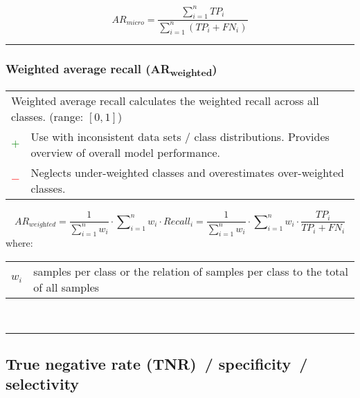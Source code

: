 \documentclass{article}
\makeatletter
\newenvironment{conditions}[1][where:]
	{\hspace{0.02\textwidth} #1 \begin{tabular}[t]{>{$}l<{$} @{${}={}$} l}}
	{\end{tabular}\\[\belowdisplayskip]}
\makeatother
\begin{document}
\begin{equation}
	\textit{AR}_\textit{micro} = \dfrac{\sum\nolimits_{i = 1}^n \textit{TP}_i}{\sum\nolimits_{i = 1}^n (\textit{TP}_i + \textit{FN}_i)}
%
	\label{equation:MIAR}
\end{equation}

\hrule


\subsubsection[Weighted average recall (ARweighted)]{Weighted average recall (AR\textsubscript{weighted}) \cite{gordon1988effect, han2014rule}}

\begin{table}[H]\centering
	\begin{tabular}{m{}m{}}
		\multicolumn{2}{m{0.95\textwidth}}{Weighted average recall calculates the weighted recall across all classes. (range: $[0, 1]$)} \\
		\textcolor{Green}{$+$} & Use with inconsistent data sets / class distributions. Provides overview of overall model performance. \\
		\textcolor{Red}{$-$}   & Neglects under-weighted classes and overestimates over-weighted classes.
	\end{tabular}
\end{table}

\begin{equation}
	\textit{AR}_\textit{weighted} = \dfrac{1}{\sum\nolimits_{i = 1}^n w_i} \cdot \sum\nolimits_{i = 1}^n w_i \cdot \textit{Recall}_i = \dfrac{1}{\sum\nolimits_{i = 1}^n w_i} \cdot \sum\nolimits_{i = 1}^n w_i \cdot \dfrac{\textit{TP}_i}{\textit{TP}_i + \textit{FN}_i}
%
	\label{equation:WAR}
\end{equation}
%
\begin{conditions}
	w_i & samples per class or the relation of samples per class to the total of all samples
\end{conditions}

\hrule


\subsection[True negative rate (TNR)~/ specificity~/ selectivity]{True negative rate (TNR)~/ specificity~/ selectivity \cite{yerushalmy1947statistical, altman1994diagnostic}}
\end{document}
